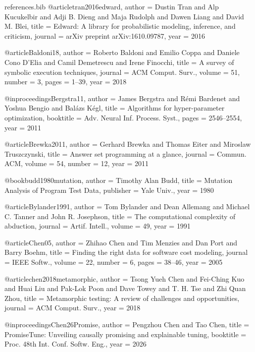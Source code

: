 \documentclass[runningheads]{llncs}
\begin{document}
\begin{filecontents}{references.bib}
@article{tran2016edward,
  author = {Dustin Tran and Alp Kucukelbir and Adji B. Dieng and Maja Rudolph and Dawen Liang and David M. Blei},
  title = {{Edward: A library for probabilistic modeling, inference, and criticism}},
  journal = {arXiv preprint arXiv:1610.09787},
  year = {2016}
}


@article{Baldoni18,
  author  = {Roberto Baldoni and Emilio Coppa and Daniele Cono D'Elia and Camil Demetrescu and Irene Finocchi},
  title   = {A survey of symbolic execution techniques},
  journal = {ACM Comput. Surv.},
  volume  = {51},
  number  = {3},
  pages   = {1--39},
  year    = {2018}
}


@inproceedings{Bergstra11,
  author    = {James Bergstra and R{\'e}mi Bardenet and Yoshua Bengio and Bal{\'a}zs K{\'e}gl},
  title     = {Algorithms for hyper-parameter optimization},
  booktitle = {Adv. Neural Inf. Process. Syst.},
  pages     = {2546--2554},
  year      = {2011}
}



@article{Brewka2011,
  author  = {Gerhard Brewka and Thomas Eiter and Miroslaw Truszczynski},
  title   = {Answer set programming at a glance},
  journal = {Commun. ACM},
  volume  = {54},
  number  = {12},
  year    = {2011}
}


@book{budd1980mutation,
  author    = {Timothy Alan Budd},
  title     = {Mutation Analysis of Program Test Data},
  publisher = {Yale Univ.},
  year      = {1980}
}



@article{Bylander1991,
  author  = {Tom Bylander and Dean Allemang and Michael C. Tanner and John R. Josephson},
  title   = {The computational complexity of abduction},
  journal = {Artif. Intell.},
  volume  = {49},
  year    = {1991}
}



@article{Chen05,
  author  = {Zhihao Chen and Tim Menzies and Dan Port and Barry Boehm},
  title   = {Finding the right data for software cost modeling},
  journal = {IEEE Softw.},
  volume  = {22},
  number  = {6},
  pages   = {38--46},
  year    = {2005}
}



@article{chen2018metamorphic,
  author  = {Tsong Yueh Chen and Fei-Ching Kuo and Huai Liu and Pak-Lok Poon and Dave Towey and T. H. Tse and Zhi Quan Zhou},
  title   = {Metamorphic testing: A review of challenges and opportunities},
  journal = {ACM Comput. Surv.},
  year    = {2018}
}



@inproceedings{Chen26Promise,
  author    = {Pengzhou Chen and Tao Chen},
  title     = {PromiseTune: Unveiling causally promising and explainable tuning},
  booktitle = {Proc. 48th Int. Conf. Softw. Eng.},
  year      = {2026}
}




\end{filecontents}
\end{document}
